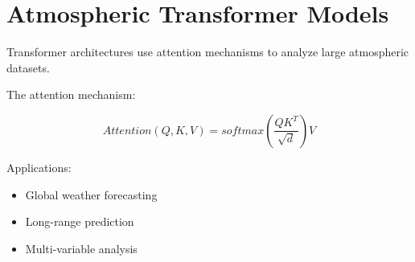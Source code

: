 \section{Atmospheric Transformer Models}


Transformer architectures use attention mechanisms to analyze
large atmospheric datasets.



The attention mechanism:


\begin{equation}
Attention(Q,K,V)
=
softmax
\left(
\frac{QK^T}{\sqrt d}
\right)V
\end{equation}



Applications:


\begin{itemize}

\item Global weather forecasting

\item Long-range prediction

\item Multi-variable analysis

\end{itemize}
